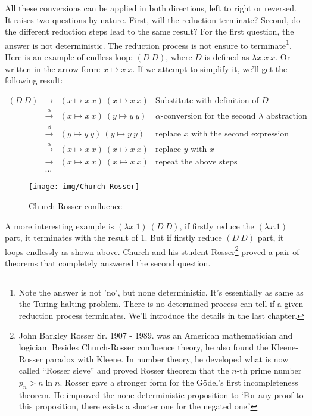\documentclass[b5paper]{article}
\begin{document}
All these conversions can be applied in both directions, left to right or reversed. It raises two questions by nature. First, will the reduction terminate? Second, do the different reduction steps lead to the same result? For the first question, the answer is not deterministic. The reduction process is not ensure to terminate\footnote{Note the answer is not 'no', but none deterministic. It's essentially as same as the Turing halting problem. There is no determined process can tell if a given reduction process terminates. We'll introduce the details in the last chapter.}. Here is an example of endless loop: $(D\ D)$, where $D$ is defined as $\lambda x. x\ x$. Or written in the arrow form: $x \mapsto x\ x$. If we attempt to simplify it, we'll get the following result:

\[
\begin{array}{rcll}
(D\ D) & \to & (x \mapsto x\ x)\ (x \mapsto x\ x) & \text{Substitute with definition of $D$} \\
       & \xrightarrow{\alpha} & (x \mapsto x\ x)\ (y \mapsto y\ y) & \text{$\alpha$-conversion for the second $\lambda$ abstraction} \\
       & \xrightarrow{\beta} & (y \mapsto y\ y)\ (y \mapsto y\ y) & \text{replace $x$ with the second expression} \\
       & \xrightarrow{\alpha} & (x \mapsto x\ x)\ (x \mapsto x\ x) & \text{replace $y$ with $x$} \\
       & \to & (x \mapsto x\ x)\ (x \mapsto x\ x) & \text{repeat the above steps} \\
       & ... &
\end{array}
\]

\begin{wrapfigure}{R}{0.3\textwidth}
 \centering
 \texttt{[image: img/Church-Rosser]}
 \caption{Church-Rosser confluence}
 \label{fig:Church-Rosser-confluence}
\end{wrapfigure}

A more interesting example is $(\lambda x . 1)\ (D\ D)$, if firstly reduce the $(\lambda x . 1)$ part, it terminates with the result of 1. But if firstly reduce $(D\ D)$ part, it loops endlessly as shown above. Church and his student Rosser\footnote{John Barkley Rosser Sr. 1907 - 1989. was an American mathematician and logician. Besides Church-Rosser confluence theory, he also found the Kleene-Rosser paradox with Kleene. In number theory, he developed what is now called ``Rosser sieve'' and proved Rosser theorem that the $n$-th prime number $p_n > n \ln n$. Rosser gave a stronger form for the  Gödel's first incompleteness theorem. He improved the none deterministic proposition to `For any proof to this proposition, there exists a shorter one for the negated one.'} proved a pair of theorems that completely answered the second question.
\end{document}
